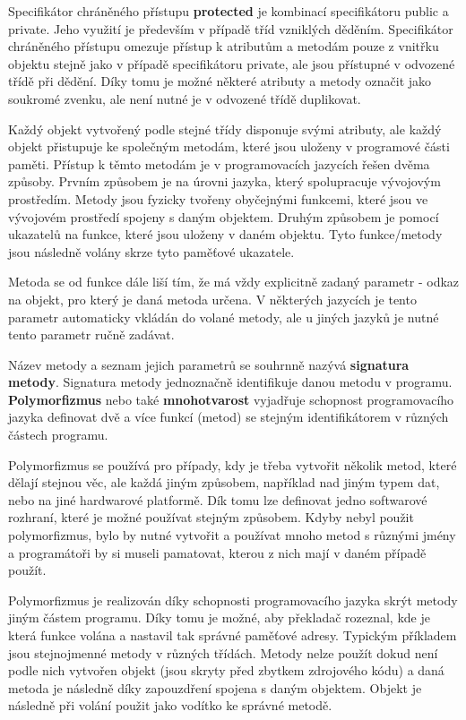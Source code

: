 
Specifikátor chráněného přístupu {\bf protected} je kombinací specifikátoru public a private. Jeho využití je především v případě tříd vzniklých děděním. Specifikátor chráněného přístupu omezuje přístup k atributům a metodám pouze z vnitřku objektu stejně jako v případě specifikátoru private, ale jsou přístupné v odvozené třídě při dědění. Díky tomu je možné některé atributy a metody označit jako soukromé zvenku, ale není nutné je v odvozené třídě duplikovat.


Každý objekt vytvořený podle stejné třídy disponuje svými atributy, ale každý objekt přistupuje ke společným metodám, které jsou uloženy v programové části paměti. Přístup k těmto metodám je v programovacích jazycích řešen dvěma způsoby. Prvním způsobem je na úrovni jazyka, který spolupracuje vývojovým prostředím. Metody jsou fyzicky tvořeny obyčejnými funkcemi, které jsou ve vývojovém prostředí spojeny s daným objektem. Druhým způsobem je pomocí ukazatelů na funkce, které jsou uloženy v daném objektu. Tyto funkce/metody jsou následně volány skrze tyto paměťové ukazatele.

Metoda se od funkce dále liší tím, že má vždy explicitně zadaný parametr - odkaz na objekt, pro který je daná metoda určena. V některých jazycích je tento parametr automaticky vkládán do volané metody, ale u jiných jazyků je nutné tento parametr ručně zadávat.


Název metody a seznam jejich parametrů se souhrnně nazývá {\bf signatura metody}. Signatura metody jednoznačně identifikuje danou metodu v programu. {\bf Polymorfizmus} nebo také {\bf mnohotvarost} vyjadřuje schopnost programovacího jazyka definovat dvě a více funkcí (metod) se stejným identifikátorem v různých částech programu. 

Polymorfizmus se používá pro případy, kdy je třeba vytvořit několik metod, které dělají stejnou věc, ale každá jiným způsobem, například nad jiným typem dat, nebo na jiné hardwarové platformě. Dík tomu lze definovat jedno softwarové rozhraní, které je možné používat stejným způsobem. Kdyby nebyl použit polymorfizmus, bylo by nutné vytvořit a používat mnoho metod s různými jmény a programátoři by si museli pamatovat, kterou z nich mají v daném případě použít. 

Polymorfizmus je realizován díky schopnosti programovacího jazyka skrýt metody jiným částem programu. Díky tomu je možné, aby překladač rozeznal, kde je která funkce volána a nastavil tak správné paměťové adresy. Typickým příkladem jsou stejnojmenné metody v různých třídách. Metody nelze použít dokud není podle nich vytvořen objekt (jsou skryty před zbytkem zdrojového kódu) a daná metoda je následně díky zapouzdření spojena s daným objektem. Objekt je následně při volání použit jako vodítko ke správné metodě.

